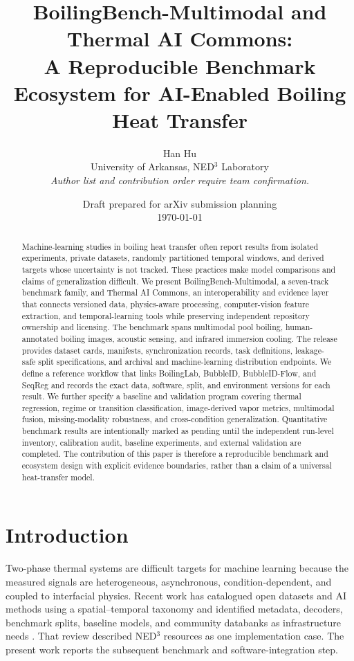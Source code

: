 \documentclass[11pt]{article}
\title{BoilingBench-Multimodal and Thermal AI Commons:\\A Reproducible Benchmark Ecosystem for AI-Enabled Boiling Heat Transfer}
\author{Han Hu\\[2pt]\small University of Arkansas, NED$^3$ Laboratory\\\small\textit{Author list and contribution order require team confirmation.}}
\date{Draft prepared for arXiv submission planning\\\today}
\begin{document}
\maketitle

\begin{abstract}
Machine-learning studies in boiling heat transfer often report results from isolated experiments, private datasets, randomly partitioned temporal windows, and derived targets whose uncertainty is not tracked. These practices make model comparisons and claims of generalization difficult. We present BoilingBench-Multimodal, a seven-track benchmark family, and Thermal AI Commons, an interoperability and evidence layer that connects versioned data, physics-aware processing, computer-vision feature extraction, and temporal-learning tools while preserving independent repository ownership and licensing. The benchmark spans multimodal pool boiling, human-annotated boiling images, acoustic sensing, and infrared immersion cooling. The release provides dataset cards, manifests, synchronization records, task definitions, leakage-safe split specifications, and archival and machine-learning distribution endpoints. We define a reference workflow that links BoilingLab, BubbleID, BubbleID-Flow, and SeqReg and records the exact data, software, split, and environment versions for each result. We further specify a baseline and validation program covering thermal regression, regime or transition classification, image-derived vapor metrics, multimodal fusion, missing-modality robustness, and cross-condition generalization. Quantitative benchmark results are intentionally marked as pending until the independent run-level inventory, calibration audit, baseline experiments, and external validation are completed. The contribution of this paper is therefore a reproducible benchmark and ecosystem design with explicit evidence boundaries, rather than a claim of a universal heat-transfer model.
\end{abstract}

\section{Introduction}
\label{sec:intro}

Two-phase thermal systems are difficult targets for machine learning because the measured signals are heterogeneous, asynchronous, condition-dependent, and coupled to interfacial physics. Recent work has catalogued open datasets and AI methods using a spatial--temporal taxonomy and identified metadata, decoders, benchmark splits, baseline models, and community databanks as infrastructure needs \citep{dunlap2026review}. That review described NED$^3$ resources as one implementation case. The present work reports the subsequent benchmark and software-integration step.
\end{document}
